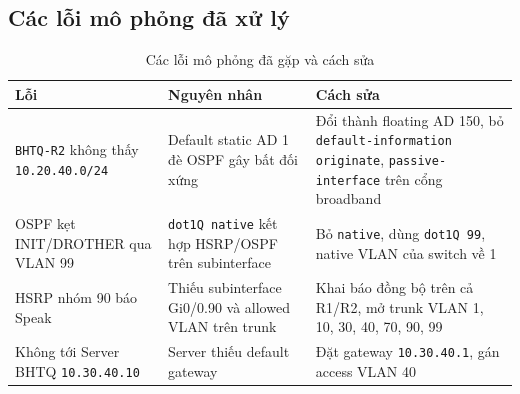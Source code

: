 \subsection{Các lỗi mô phỏng đã xử lý}
\begin{small}
\setlength{\tabcolsep}{4pt}
\begin{longtable}{|p{3.4cm}|p{4.4cm}|p{6.0cm}|}
\caption{Các lỗi mô phỏng đã gặp và cách sửa} \label{tab:sim_errors} \\
\hline
\textbf{Lỗi} & \textbf{Nguyên nhân} & \textbf{Cách sửa} \\ \hline
\endhead
\texttt{BHTQ-R2} không thấy \texttt{10.20.40.0/24} & Default static AD 1 đè OSPF gây bất đối xứng & Đổi thành floating AD 150, bỏ \texttt{default-information originate}, \texttt{passive-interface} trên cổng broadband \\ \hline
OSPF kẹt INIT/DROTHER qua VLAN 99 & \texttt{dot1Q native} kết hợp HSRP/OSPF trên subinterface & Bỏ \texttt{native}, dùng \texttt{dot1Q 99}, native VLAN của switch về 1 \\ \hline
HSRP nhóm 90 báo Speak & Thiếu subinterface Gi0/0.90 và allowed VLAN trên trunk & Khai báo đồng bộ trên cả R1/R2, mở trunk VLAN 1, 10, 30, 40, 70, 90, 99 \\ \hline
Không tới Server BHTQ \texttt{10.30.40.10} & Server thiếu default gateway & Đặt gateway \texttt{10.30.40.1}, gán access VLAN 40 \\ \hline
\end{longtable}
\end{small}
